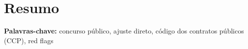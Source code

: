 
\chapter*{Resumo}
\label{Chp:Resumo}

\textbf{Palavras-chave:} concurso público, ajuste direto, código dos contratos públicos (CCP), red flags

